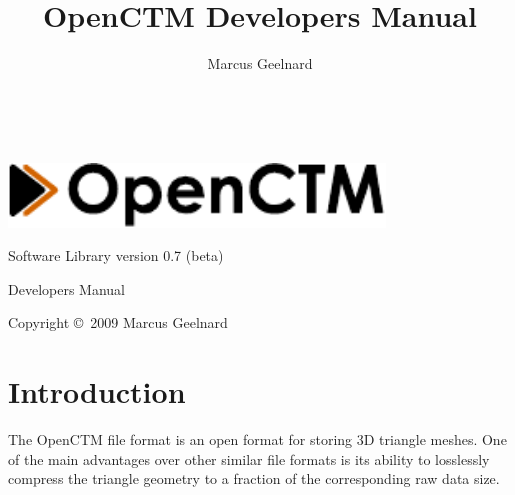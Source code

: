 %
%



\author{Marcus Geelnard}
\title{OpenCTM Developers Manual}




\begin{titlepage}
\begin{center}
~
\vspace{5cm}

\includegraphics[width=10.0cm]{logo.pdf}
\vspace{0.4cm}

{\large Software Library version 0.7 (beta)}

\vspace{1.0cm}

{\Large Developers Manual}
\vspace{1.5cm}

Copyright \copyright \ 2009 Marcus Geelnard
\end{center}
\end{titlepage}



\tableofcontents



\chapter{Introduction}
The OpenCTM file format is an open format for storing 3D triangle meshes.
One of the main advantages over other similar file formats is its ability
to losslessly compress the triangle geometry to a fraction of the corresponding
raw data size.

